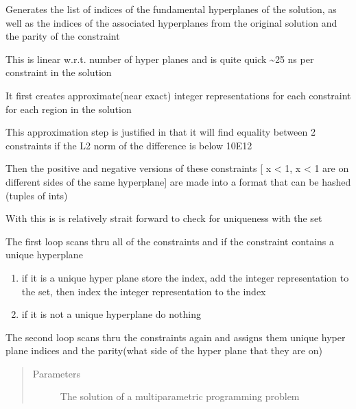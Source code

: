 \documentclass[letterpaper,10pt,english]{sphinxmanual}
\begin{document}
\begin{fulllineitems}
\label{\detokenize{mpo.upop:mpo.upop.upop_utils.find_unique_hyperplanes}}
\sphinxAtStartPar
Generates the list of indices of the fundamental hyperplanes of the solution, as well as the indices of the associated hyperplanes from the original solution and the parity of the constraint

\sphinxAtStartPar
This is linear w.r.t. number of hyper planes and is quite quick \textasciitilde{}25 ns per constraint in the solution

\sphinxAtStartPar
It first creates approximate(near exact) integer representations for each constraint for each region in the solution

\sphinxAtStartPar
This approximation step is justified in that it will find equality between 2 constraints if the L2 norm of the difference is below 10E\sphinxhyphen{}12

\sphinxAtStartPar
Then the positive and negative versions of these constraints {[} \sphinxhyphen{}x \textless{} \sphinxhyphen{}1, x \textless{} 1 are on different sides of the same hyperplane{]} are made into a format that can be hashed (tuples of ints)

\sphinxAtStartPar
With this is is relatively strait forward to check for uniqueness with the set

\sphinxAtStartPar
The first loop scans thru all of the constraints and if the constraint contains a unique hyperplane
\begin{enumerate}
%
\item {} 
\sphinxAtStartPar
if it is a unique hyper plane store the index, add the integer representation to the set, then index the integer representation to the index

\item {} 
\sphinxAtStartPar
if it is not a unique hyperplane do nothing

\end{enumerate}

\sphinxAtStartPar
The second loop scans thru the constraints again and assigns them unique hyper plane indices and the parity(what side of the hyper plane that they are on)
\begin{quote}\begin{description}
\item[{Parameters}] \leavevmode
\sphinxAtStartPar
{} \textendash{} The solution of a multiparametric programming problem


\end{description}
\end{quote}
\end{fulllineitems}
\end{document}
